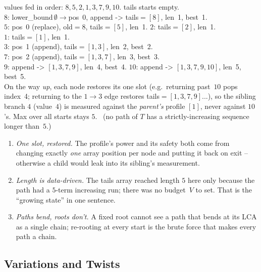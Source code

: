 \begin{tracebox}[Rollback profile along the chain $8\!\to\!10$ on $T$ (start $s=8$)]
values fed in order: $8,5,2,1,3,7,9,10$. tails starts empty.\\
$8$: lower\_bound$\,\emptyset\to$pos~0, append -> tails$=[8]$, len~1, best~1.\\
$5$: pos~0 (replace), old$=8$, tails$=[5]$, len~1. \;\;$2$: tails$=[2]$, len~1.\\
$1$: tails$=[1]$, len~1.\\
$3$: pos~1 (append), tails$=[1,3]$, len~2, best~2.\\
$7$: pos~2 (append), tails$=[1,3,7]$, len~3, best~3.\\
$9$: append -> $[1,3,7,9]$, len~4, best~4. \;\;$10$: append -> $[1,3,7,9,10]$, len~5, best~5.\\
On the way \emph{up}, each node restores its one slot (e.g.\ returning past~$10$ pops
index~4; returning to the $1\!\to\!3$ edge restores tails$=[1,3,7,9]$...), so the sibling
branch $4$ (value~$4$) is measured against the \emph{parent's} profile $[1]$, never
against $10$'s. Max over all starts stays $5$. \checkmark\ (no path of $T$ has a
strictly-increasing sequence longer than~$5$.)
\end{tracebox}

\begin{insightbox}
\begin{enumerate}[nosep, leftmargin=1.6em]
  \item \emph{One slot, restored.} The profile's power and its safety both come from
        changing exactly \emph{one} array position per node and putting it back on
        exit -- otherwise a child would leak into its sibling's measurement.
  \item \emph{Length is data-driven.} The tails array reached length $5$ here only
        because the path had a $5$-term increasing run; there was no budget~$V$ to
        set. That is the ``growing state'' in one sentence.
  \item \emph{Paths bend, roots don't.} A fixed root cannot see a path that bends at
        its LCA as a single chain; re-rooting at every start is the brute force that
        makes every path a chain.
\end{enumerate}
\end{insightbox}

\subsection{Variations and Twists}

